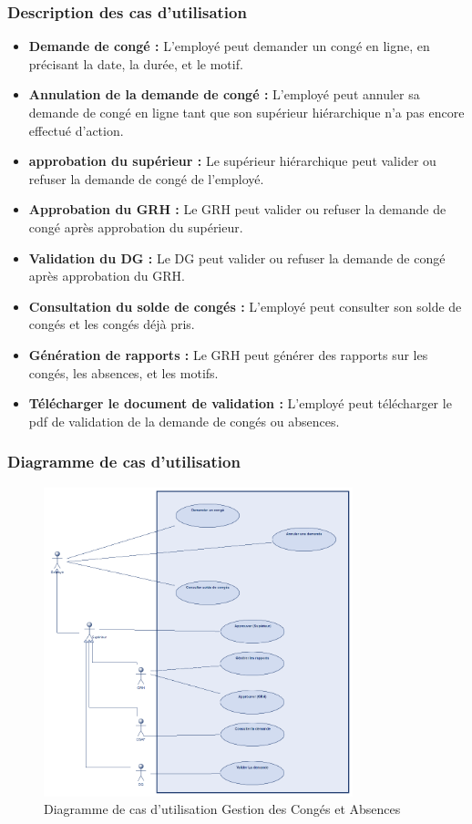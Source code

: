 \subsubsection{Description des cas d'utilisation}
\begin{itemize}
    \item \textbf{Demande de congé :} L'employé peut demander un congé en ligne, en précisant la date, la durée, et le motif.
    \item \textbf{Annulation de la demande de congé :} L'employé peut annuler sa demande de congé en ligne tant que son supérieur hiérarchique n'a pas encore effectué d'action.
    \item \textbf{approbation du supérieur :} Le supérieur hiérarchique peut valider ou refuser la demande de congé de l'employé.
    \item \textbf{Approbation du GRH :} Le GRH peut valider ou refuser la demande de congé après approbation du supérieur.
    \item \textbf{Validation du DG :} Le DG peut valider ou refuser la demande de congé après approbation du GRH.
    \item \textbf{Consultation du solde de congés :} L'employé peut consulter son solde de congés et les congés déjà pris.
    \item \textbf{Génération de rapports :} Le GRH peut générer des rapports sur les congés, les absences, et les motifs.
    \item \textbf{Télécharger le document de validation :} L'employé peut télécharger le pdf de validation de la demande de congés ou absences.
\end{itemize}
\subsubsection{Diagramme de cas d'utilisation}
\begin{figure}[H]
    \centering
    \includegraphics[width=0.8\textwidth]{images/diagrammes/use-cases/conges.png}
    \caption{Diagramme de cas d'utilisation Gestion des Congés et Absences}
    \label{fig:use_case_gestion_conges}

\end{figure}
